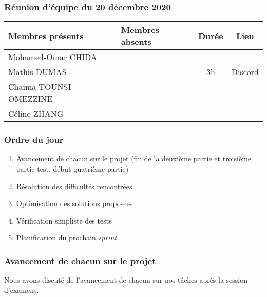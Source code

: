 


% 
\subsubsection*{\large{Réunion d'équipe du 20 décembre 2020}}
\begin{center}
\begin{tabular}{| l | l || c | c |}
    \hline
    Membres présents & Membres absents & Durée & Lieu \\
    \hline
    Mohamed-Omar CHIDA & & & \\ Mathis DUMAS & & 3h & Discord \\ Chaima TOUNSI OMEZZINE & & & \\ Céline ZHANG & & & \\
    \hline
\end{tabular}
\end{center}

\subsubsection*{Ordre du jour}
\begin{enumerate}
    \item Avancement de chacun sur le projet (fin de la deuxième partie et troisième partie test, début quatrième partie)
    \item Résolution des difficultés rencontrées
    \item Optimisation des solutions proposées
    \item Vérification simpliste des tests
    \item Planification du prochain \textsl{sprint}
\end{enumerate}

\subsubsection*{Avancement de chacun sur le projet}
Nous avons discuté de l'avancement de chacun sur nos tâches après la session d'examens.
